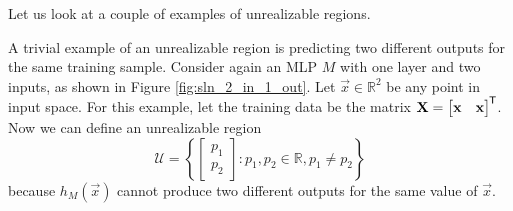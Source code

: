 Let us look at a couple of examples of unrealizable regions.
\begin{example}
    A trivial example of an unrealizable region is predicting two different outputs for the same training sample.
    Consider again an MLP $M$ with one layer and two inputs, as shown in Figure \ref{fig:sln_2_in_1_out}.
    Let $\vec{x}\in \mathbb{R}^2$ be any point in input space.
    For this example, let the training data be the matrix
    $
        \mathbf{X} = \begin{bmatrix}
            \mathbf{x} & \mathbf{x}
        \end{bmatrix}^{\mkern-1.5mu\mathsf{T}}
    $.
    Now we can define an unrealizable region
    \begin{equation*}
        \mathcal{U} = \left\{
            \begin{bmatrix}
                p_1 \\ p_2
            \end{bmatrix} : p_1, p_2 \in \mathbb{R}, p_1 \neq p_2
        \right\}
    \end{equation*}
    because $h_M(\vec{x})$ cannot produce two different outputs for the same value of $\vec{x}$.
\end{example}
